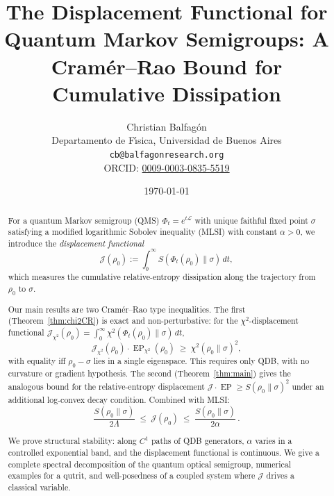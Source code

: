 \documentclass[11pt,a4paper]{article}
\theoremstyle{definition}
\theoremstyle{remark}
\DeclareMathOperator{\EP}{EP}
\newcommand{\LL}{\mathcal{L}}
\newcommand{\Jchi}{\mathcal{J}_{\chi^2}}
\newcommand{\EPchi}{\EP_{\chi^2}}
\begin{document}
\title{The Displacement Functional for Quantum Markov Semigroups:
A Cram\'er--Rao Bound for Cumulative Dissipation}

\author{Christian Balfag\'on\\[4pt]
\small Departamento de F\'{\i}sica, Universidad de Buenos Aires\\
\small \texttt{cb@balfagonresearch.org}\\
\small ORCID: \href{https://orcid.org/0009-0003-0835-5519}{0009-0003-0835-5519}}

\date{\today}

\maketitle

\begin{abstract}
For a quantum Markov semigroup (QMS) $\Phi_t = e^{t\LL}$ with unique
faithful fixed point $\sigma$ satisfying a modified logarithmic
Sobolev inequality (MLSI) with constant $\alpha > 0$, we introduce
the \emph{displacement functional}
\[
  \mathcal{J}(\rho_0)
  := \int_0^\infty S(\Phi_t(\rho_0)\|\sigma)\,dt,
\]
which measures the cumulative relative-entropy dissipation along the
trajectory from $\rho_0$ to $\sigma$.

Our main results are two Cram\'er--Rao type inequalities.
The first (Theorem~\ref{thm:chi2CR}) is exact and non-perturbative:
for the $\chi^2$-displacement functional
$\Jchi(\rho_0) = \int_0^\infty \chi^2(\Phi_t(\rho_0)\|\sigma)\,dt$,
\[
  \Jchi(\rho_0) \cdot \EPchi(\rho_0)
  \;\ge\; \chi^2(\rho_0\|\sigma)^2,
\]
with equality iff $\rho_0 - \sigma$ lies in a single eigenspace.
This requires only QDB, with no curvature or gradient hypothesis.
The second (Theorem~\ref{thm:main}) gives the analogous bound for
the relative-entropy displacement
$\mathcal{J}\cdot\EP \ge S(\rho_0\|\sigma)^2$ under an additional
log-convex decay condition.  Combined with MLSI:
\[
  \frac{S(\rho_0\|\sigma)}{2\Lambda}
  \;\le\; \mathcal{J}(\rho_0)
  \;\le\; \frac{S(\rho_0\|\sigma)}{2\alpha}\,.
\]

We prove structural stability: along $C^1$ paths of QDB generators,
$\alpha$ varies in a controlled exponential band, and the displacement
functional is continuous.  We give a complete spectral decomposition
of the quantum optical semigroup, numerical examples for a qutrit,
and well-posedness of a coupled system where $\mathcal{J}$ drives a
classical variable.


\end{abstract}
\end{document}
